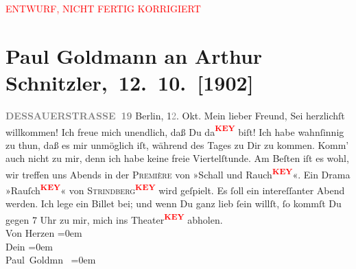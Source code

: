 
\begin{center}
            \textcolor{red}{ENTWURF, NICHT FERTIG KORRIGIERT}
                      \end{center}
            
         \renewcommand{\erwaehnteOrte}{Orte: Berlin, Dessauer Straße}
         \renewcommand{\erwaehnteWerke}{}
               \section[ Paul Goldmann an Arthur Schnitzler, 12. 10. {[}1902{]}]{ Paul Goldmann an Arthur Schnitzler, 12. 10. {[}1902{]}}\nopagebreak{}\rehead{ }\begin{ledgroupsized}[t]{13cm}\normalsize\beginnumbering \toendnotes[C]{\smallbreak\pagebreak[2]} 
\pstart
           \noindent{}\raggedleft{}{\pb}\textcolor{gray}{\textbf{DESSAUERSTRASSE 19}}\pend
           \pstart
           Berlin, 1\textcolor{gray}{2}.
                            Okt.\pend
           \pstart\center{}Mein lieber Freund,\pend\pstart
           Sei herzlichſt willkommen! Ich freue mich unendlich, daß Du da\textcolor{red}{\textsuperscript{\textbf{KEY}}} biſt! \pend
           \pstart
           Ich habe wahnſinnig zu thun, daß es mir unmöglich iſt, während des Tages zu
                    Dir zu kommen. Komm’ auch nicht zu mir, denn ich habe keine freie Viertelſtunde.
                    Am Beſten iſt es wohl, wir treffen uns Abends in der \textsc{Première} von »Schall und Rauch\textcolor{red}{\textsuperscript{\textbf{KEY}}}«. Ein \strikeout{\textcolor{gray}{Stü}} Drama »Rauſch\textcolor{red}{\textsuperscript{\textbf{KEY}}}« von \textsc{Strindberg\textcolor{red}{\textsuperscript{\textbf{KEY}}}}{\pb} wird geſpielt. Es ſoll ein intereſſanter
                    Abend werden. Ich lege ein Billet bei; und wenn Du ganz lieb ſein willſt, ſo
                    kommſt Du gegen 7 Uhr zu mir, mich ins Theater\textcolor{red}{\textsuperscript{\textbf{KEY}}} abholen. {\\[\baselineskip]}Von Herzen\pend
           \leftskip=0em{}\pstart
           {\\[\baselineskip]}Dein\pend
           \leftskip=0em{}\pstart
           {\\[\baselineskip]}\spacefill\mbox{Paul Goldmn }\pend
           \leftskip=0em{}
         
         \endnumbering{}\end{ledgroupsized}\begin{anhang}\end{anhang}\newcommand{\dateiname}{L03226}\newcommand{\titel}{Paul Goldmann an Arthur Schnitzler, 12. 10. [1902]}\newcommand{\editorInnen}{Martin Anton Müller und Laura Untner}
      